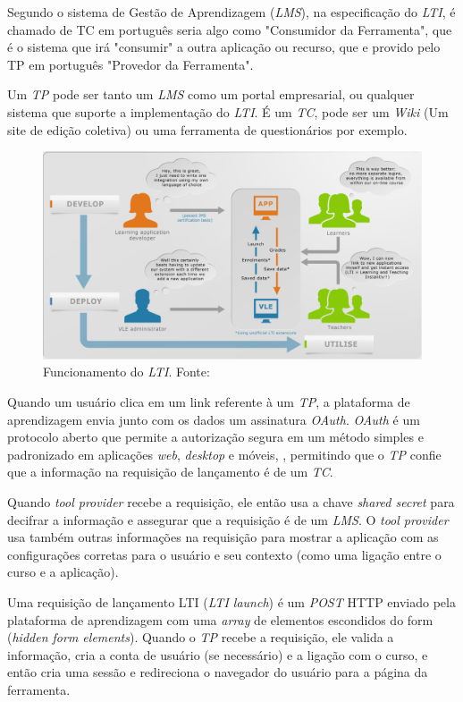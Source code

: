 \par
Segundo  o sistema de Gestão de Aprendizagem (\textit{LMS}), na especificação do \textit{LTI}, é chamado de \ac{TC} em português seria algo como "Consumidor da Ferramenta", que é o sistema que irá "consumir" a outra aplicação ou recurso, que e provido pelo \ac{TP} em português "Provedor da Ferramenta".
\par
Um \textit{TP} pode ser tanto um \textit{LMS} como um portal empresarial, ou qualquer sistema que suporte a implementação do \textit{LTI}. É um \textit{TC}, pode ser um \textit{Wiki} (Um site de edição coletiva) ou uma ferramenta de questionários por exemplo.
\begin{figure}[h]
    \centering
    \label{fig:ims-lti-funcionamento}
    \includegraphics[keepaspectratio=true,scale=0.5]{figuras/ims-lti-funcionamento.png}
    \caption{Funcionamento do \textit{LTI}. Fonte: }
\end{figure}
\par
Quando um usuário clica em um link referente à um \textit{TP}, a plataforma de aprendizagem envia junto com os dados um assinatura \textit{OAuth}. \textit{OAuth} é um protocolo aberto que permite a autorização segura em um método simples e padronizado em aplicações \textit{web}, \textit{desktop} e móveis, \cite{oauth}, permitindo que o \textit{TP} confie que a informação na requisição de lançamento é de um \textit{TC}.
\par
Quando \textit{tool provider} recebe a requisição, ele então usa a chave \textit{shared secret} para decifrar a informação e assegurar que a requisição é de um \textit{LMS}. O \textit{tool provider} usa também outras informações na requisição para mostrar a aplicação com as configurações corretas para o usuário e seu contexto (como uma ligação entre o curso e a aplicação).
\par
Uma requisição de lançamento LTI (\textit{LTI launch}) é um \textit{POST} \ac{HTTP} enviado pela plataforma de aprendizagem com uma \textit{array} de elementos escondidos do form (\textit{hidden form elements}). Quando o \textit{TP} recebe a requisição, ele valida a informação, cria a conta de usuário (se necessário) e a ligação com o curso, e então cria uma sessão e redireciona o navegador do usuário para a página da ferramenta.